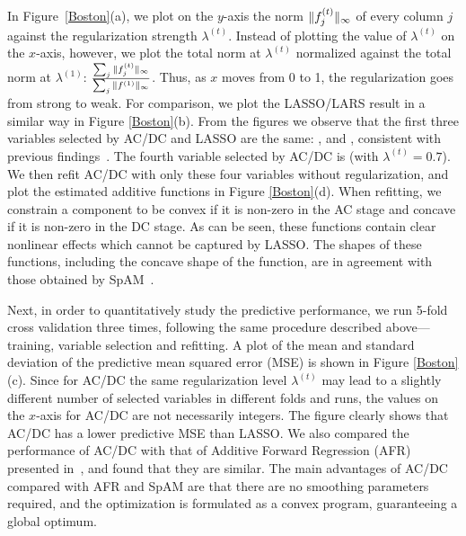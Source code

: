 In Figure~\ref{Boston}(a), we plot on the $y$-axis the norm
$\|f^{(t)}_j\|_{\infty}$ of every column $j$ against the
regularization strength $\lambda^{(t)}$. Instead of plotting the value
of $\lambda^{(t)}$ on the $x$-axis,  however, we plot the total norm at
$\lambda^{(t)}$ normalized against the total norm at $\lambda^{(1)}$:
$\frac{\sum_j \|f^{(t)}_j\|_{\infty}}{\sum_j
  \|f^{(1)}\|_{\infty}}$. Thus, as $x$ moves from 0 to 1, the
regularization goes from strong to weak. For comparison, we plot the
LASSO/LARS result in a similar way in Figure \ref{Boston}(b).  From
the figures we observe that the first three variables selected by
AC/DC and LASSO are the same: ,  and ,
consistent with previous findings~\citep{SpAM:07}.  The fourth
variable selected by AC/DC is  (with $\lambda^{(t)}=0.7$).
We then refit AC/DC with only these four variables without
regularization, and plot the estimated additive functions in Figure
\ref{Boston}(d). When refitting, we constrain a component to be convex
if it is non-zero in the AC stage and concave if it is non-zero in the
DC stage. As can be seen, these functions contain clear nonlinear
effects which cannot be captured by LASSO. The shapes of these
functions, including the concave shape of the  function,
are in agreement with those obtained by SpAM~\citep{SpAM:07}.

Next, in order to quantitatively study the predictive performance, we
run 5-fold cross validation three times, following the same procedure
described above---training, variable selection and refitting.  A plot
of the mean and standard deviation of the predictive mean squared
error (MSE) is shown in Figure \ref{Boston}(c). Since for AC/DC the same
regularization level $\lambda^{(t)}$ may lead to a slightly different number of selected
variables in different folds and runs, the values on the $x$-axis
for AC/DC are not necessarily integers. The figure clearly shows that AC/DC has a 
lower predictive MSE than LASSO.  We also compared the performance of
AC/DC with that of Additive Forward Regression (AFR) presented
in~\cite{Xi:09}, and found that they are similar.  The main advantages
of AC/DC compared with AFR and SpAM are that there are no smoothing
parameters required, and the optimization is formulated
as a convex program, guaranteeing a global optimum.

